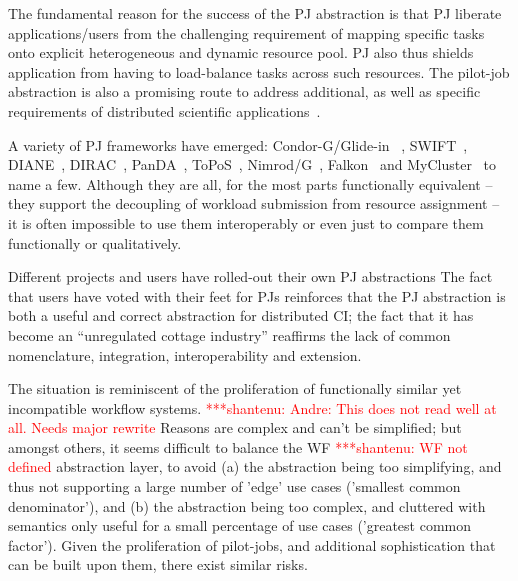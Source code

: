 \documentclass[conference,final]{IEEEtran}
\newcommand{\jhanote}[1]{ {\textcolor{red} { ***shantenu: #1 }}}
\newcommand{\jhanote}[1]{}
\begin{document}
The fundamental reason for the success of the PJ abstraction is that
PJ liberate applications/users from the challenging requirement of
mapping specific tasks onto explicit heterogeneous and dynamic
resource pool.  PJ also thus shields application from having to
load-balance tasks across such resources.  The pilot-job abstraction
is also a promising route to address additional, as well as specific
requirements of distributed scientific
applications~\cite{ko-efficient,DBLP:conf/hpdc/KimHMAJ10,bigjob_cloudcom10}.

A variety of PJ frameworks have emerged:
Condor-G/Glide-in~\cite{condor-g} , SWIFT~\cite{Wilde2011},
DIANE~\cite{Moscicki:908910}, DIRAC~\cite{1742-6596-219-6-062049},
PanDA~\cite{1742-6596-219-6-062041}, ToPoS~\cite{topos},
Nimrod/G~\cite{10.1109/HPC.2000.846563}, Falkon~\cite{1362680} and
MyCluster~\cite{1652061} to name a few. Although they are all, for the
most parts functionally equivalent -- they support the decoupling of
workload submission from resource assignment -- it is often impossible
to use them interoperably or even just to compare them functionally or
qualitatively.


Different projects and users have rolled-out their own PJ abstractions
The fact that users have voted with their feet for PJs reinforces that
the PJ abstraction is both a useful and correct abstraction for
distributed CI; the fact that it has become an ``unregulated cottage
industry'' reaffirms the lack of common nomenclature, integration,
interoperability and extension.

The situation is reminiscent of the proliferation of functionally
similar yet incompatible workflow systems. \jhanote{Andre: This does
  not read well at all. Needs major rewrite} Reasons are complex and
can't be simplified; but amongst others, it seems difficult to balance
the WF \jhanote{WF not defined} abstraction layer, to avoid (a) the
abstraction being too simplifying, and thus not supporting a large
number of 'edge' use cases ('smallest common denominator'), and (b)
the abstraction being too complex, and cluttered with semantics only
useful for a small percentage of use cases ('greatest common factor').
Given the proliferation of pilot-jobs, and additional sophistication
that can be built upon them, there exist similar risks.

\end{document}
